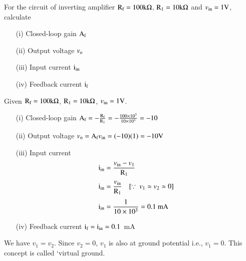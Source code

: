 \begin{problem}\label{prob4.14}
For the circuit of inverting amplifier $\textrm{R}_{\textrm{f}}=100 \textrm{k}\Omega$, $\textrm{R}_{1}=10 \textrm{k}\Omega$ and $v_{\text{in}}=1\textrm{V}$, calculate
\begin{itemize}
\item[(i)] Closed-loop gain $\textrm{A}_{\textrm{f}}$

\item[(ii)] Output voltage $v_{\textrm{o}}$

\item[(iii)] Input current $\textrm{i}_{\text{in}}$

\item[(iv)] Feedback current $\textrm{i}_{\textrm{f}}$
\end{itemize}
\end{problem}

\begin{solution}
Given $\textrm{R}_{\textrm{f}}=100 \textrm{k}\Omega$, $\textrm{R}_{1}=10 \textrm{k} \Omega$, $v_{\text{in}}=1\textrm{V}$.
\begin{itemize}
\item[(i)] Closed-loop gain $\textrm{A}_{\textrm{f}}=-\frac{\textrm{R}_{\textrm{f}}}{\textrm{R}_{1}}=-\frac{100\times 10^{3}}{10\times 10^{3}}=-10$

\item[(ii)] Output voltage $v_{\textrm{o}}=\textrm{A}_{\textrm{f}}v_{\text{in}}=(-10)(1)=-10\textrm{V}$

\item[(iii)] Input current
\begin{align*}
\rmi_{\text{in}} &= \frac{v_{\text{in}}-v_{1}}{\rmR_{1}}\\[3pt]
\rmi_{\text{in}} &= \frac{v_{\text{in}}}{\rmR_{1}}\quad [\because \ v_{1}\simeq v_{2}\simeq 0]\\[3pt]
\rmi_{\text{in}} &= \frac{1}{10\times 10^{3}}=0.1\text{~mA}
\end{align*}

\item[(iv)] Feedback current $\textrm{i}_{\textrm{f}}=\textrm{i}_{\text{in}}=0.1$~mA
\end{itemize}
We have $v_{1}=v_{2}$. Since $v_{2}=0$, $v_{1}$ is also at ground potential i.e., $v_{1}=0$. This concept is called `virtual ground.
\end{solution}


